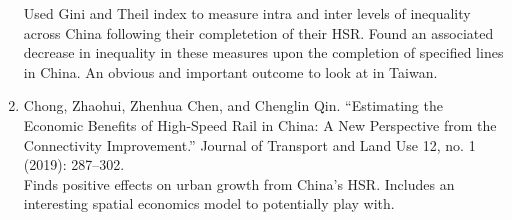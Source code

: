 \documentclass[12pt, reqno]{amsart}
\theoremstyle{definition}
\theoremstyle{remark}
\numberwithin{equation}{section}
\begin{document}
\begin{enumerate}
    \vspace{.5em} Used Gini and Theil index to measure intra and inter levels of inequality across China following their completetion of their HSR. Found an associated decrease in inequality in these measures upon the completion of specified lines in China. An obvious and important outcome to look at in Taiwan. \\

\item Chong, Zhaohui, Zhenhua Chen, and Chenglin Qin. “Estimating the Economic Benefits of High-Speed Rail in China: A New Perspective from the Connectivity Improvement.” Journal of Transport and Land Use 12, no. 1 (2019): 287–302.\\
    
    \vspace{.5em} Finds positive effects on urban growth from China's HSR. Includes an interesting spatial economics model to potentially play with.

\end{enumerate}
\end{document}
